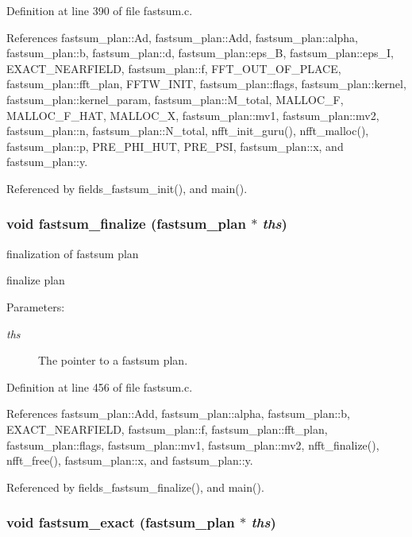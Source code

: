 Definition at line 390 of file fastsum.c.

References fastsum\_\-plan::Ad, fastsum\_\-plan::Add, fastsum\_\-plan::alpha, fastsum\_\-plan::b, fastsum\_\-plan::d, fastsum\_\-plan::eps\_\-B, fastsum\_\-plan::eps\_\-I, EXACT\_\-NEARFIELD, fastsum\_\-plan::f, FFT\_\-OUT\_\-OF\_\-PLACE, fastsum\_\-plan::fft\_\-plan, FFTW\_\-INIT, fastsum\_\-plan::flags, fastsum\_\-plan::kernel, fastsum\_\-plan::kernel\_\-param, fastsum\_\-plan::M\_\-total, MALLOC\_\-F, MALLOC\_\-F\_\-HAT, MALLOC\_\-X, fastsum\_\-plan::mv1, fastsum\_\-plan::mv2, fastsum\_\-plan::n, fastsum\_\-plan::N\_\-total, nfft\_\-init\_\-guru(), nfft\_\-malloc(), fastsum\_\-plan::p, PRE\_\-PHI\_\-HUT, PRE\_\-PSI, fastsum\_\-plan::x, and fastsum\_\-plan::y.

Referenced by fields\_\-fastsum\_\-init(), and main().\hypertarget{group__applications__fastsum_gb989ea4659fe681bd4c025e82756f769}{
\subsubsection{\setlength{\rightskip}{0pt plus 5cm}void fastsum\_\-finalize ({\bf fastsum\_\-plan} $\ast$ {\em ths})}}
\label{group__applications__fastsum_gb989ea4659fe681bd4c025e82756f769}


finalization of fastsum plan 

finalize plan

\begin{Desc}
\item[Parameters:]
\begin{description}
\item[{\em ths}]The pointer to a fastsum plan. \end{description}
\end{Desc}


Definition at line 456 of file fastsum.c.

References fastsum\_\-plan::Add, fastsum\_\-plan::alpha, fastsum\_\-plan::b, EXACT\_\-NEARFIELD, fastsum\_\-plan::f, fastsum\_\-plan::fft\_\-plan, fastsum\_\-plan::flags, fastsum\_\-plan::mv1, fastsum\_\-plan::mv2, nfft\_\-finalize(), nfft\_\-free(), fastsum\_\-plan::x, and fastsum\_\-plan::y.

Referenced by fields\_\-fastsum\_\-finalize(), and main().\hypertarget{group__applications__fastsum_gaee3dd954ffc99e4330fabe16ccad0fd}{
\subsubsection{\setlength{\rightskip}{0pt plus 5cm}void fastsum\_\-exact ({\bf fastsum\_\-plan} $\ast$ {\em ths})}}
\label{group__applications__fastsum_gaee3dd954ffc99e4330fabe16ccad0fd}


